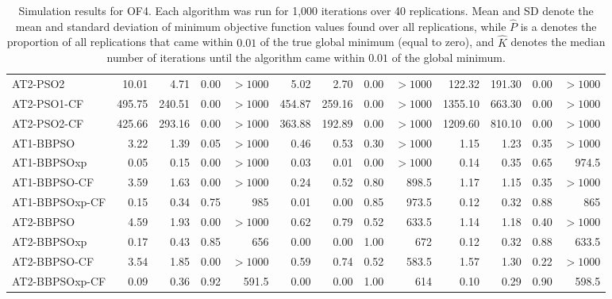 \documentclass[cmbright]{staauth}
\numberwithin{table}{section}
\begin{document}
\begin{table}[ht]
\begin{tabular}{l|rrrr|rrrr|rrrr}
  AT2-PSO2 & 10.01 & 4.71 & 0.00 & $> 1000$ & 5.02 & 2.70 & 0.00 & $> 1000$ & 122.32 & 191.30 & 0.00 & $> 1000$ \\
  AT2-PSO1-CF & 495.75 & 240.51 & 0.00 & $> 1000$ & 454.87 & 259.16 & 0.00 & $> 1000$ & 1355.10 & 663.30 & 0.00 & $> 1000$ \\
  AT2-PSO2-CF & 425.66 & 293.16 & 0.00 & $> 1000$ & 363.88 & 192.89 & 0.00 & $> 1000$ & 1209.60 & 810.10 & 0.00 & $> 1000$ \\
   \hline
AT1-BBPSO & 3.22 & 1.39 & 0.05 & $> 1000$ & 0.46 & 0.53 & 0.30 & $> 1000$ & 1.15 & 1.23 & 0.35 & $> 1000$ \\
  AT1-BBPSOxp & 0.05 & 0.15 & 0.00 & $> 1000$ & 0.03 & 0.01 & 0.00 & $> 1000$ & 0.14 & 0.35 & 0.65 & 974.5 \\
  AT1-BBPSO-CF & 3.59 & 1.63 & 0.00 & $> 1000$ & 0.24 & 0.52 & 0.80 & 898.5 & 1.17 & 1.15 & 0.35 & $> 1000$ \\
  AT1-BBPSOxp-CF & 0.15 & 0.34 & 0.75 & 985 & 0.01 & 0.00 & 0.85 & 973.5 & 0.12 & 0.32 & 0.88 & 865 \\
   \hline
AT2-BBPSO & 4.59 & 1.93 & 0.00 & $> 1000$ & 0.62 & 0.79 & 0.52 & 633.5 & 1.14 & 1.18 & 0.40 & $> 1000$ \\
  AT2-BBPSOxp & 0.17 & 0.43 & 0.85 & 656 & 0.00 & 0.00 & 1.00 & 672 & 0.12 & 0.32 & 0.88 & 633.5 \\
  AT2-BBPSO-CF & 3.54 & 1.85 & 0.00 & $> 1000$ & 0.59 & 0.74 & 0.52 & 583.5 & 1.57 & 1.30 & 0.22 & $> 1000$ \\
  AT2-BBPSOxp-CF & 0.09 & 0.36 & 0.92 & 591.5 & 0.00 & 0.00 & 1.00 & 614 & 0.10 & 0.29 & 0.90 & 598.5 \\
   \hline
\end{tabular}
\endgroup
\caption{Simulation results for OF4. Each algorithm was run for 1,000 iterations over 40 replications. Mean and SD denote the mean and standard deviation of minimum objective function values found over all replications, while $\widehat{P}$ is a denotes the proportion of all replications that came within $0.01$ of the true global minimum (equal to zero), and $\widehat{K}$ denotes the median number of iterations until the algorithm came within $0.01$ of the global minimum.}
\label{tab:psosim4}
\end{table}
\end{document}
